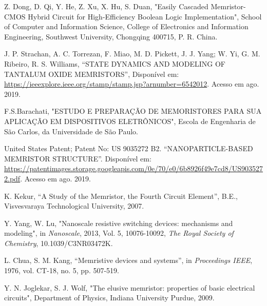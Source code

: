 \documentclass{ceel}
\begin{document}
\begin{multicols}{2}
\begin{thebibliography}{9}
    Z. Dong, D. Qi, Y. He, Z. Xu, X. Hu, S. Duan, "Easily Cascaded Memristor-CMOS Hybrid Circuit
for High-Efficiency Boolean Logic Implementation", School of Computer and Information Science,
College of Electronics and Information Engineering,
Southwest University, Chongqing 400715, P. R. China.

    J. P. Strachan, A. C. Torrezan, F. Miao, M. D. Pickett, J. J. Yang; W. Yi, G. M. Ribeiro, R. S. Williams, “STATE DYNAMICS AND MODELING OF TANTALUM OXIDE MEMRISTORS”, Disponível em: \url{https://ieeexplore.ieee.org/stamp/stamp.jsp?arnumber=6542012}. Acesso em ago. 2019.
 
   F.S.Barachati, "ESTUDO E PREPARAÇÃO DE MEMORISTORES PARA SUA APLICAÇÃO EM DISPOSITIVOS ELETRÔNICOS", Escola de Engenharia de São Carlos, da Universidade de São Paulo. 

    United States Patent; Patent No: US 9035272 B2. “NANOPARTICLE-BASED MEMRISTOR STRUCTURE”. Disponível em: \url{https://patentimages.storage.googleapis.com/0e/70/e0/6b8926f49e7cd8/US9035272.pdf}. Acesso em ago. 2019.
    

    K. Kekur,
    “A Study of the Memristor, the Fourth Circuit Element”, 
   B.E., Visvesvaraya Technological University, 2007.

Y. Yang, W. Lu,
"Nanoscale resistive switching devices: mechanisms and modeling",
in \emph{Nanoscale},
2013, Vol. 5, 10076-10092, \emph{The Royal Society of Chemistry}, 10.1039/C3NR03472K. 

    L. Chua, S. M. Kang,
    “Memristive devices and systems”, 
    in \emph{Proceedings IEEE}, 1976, vol. CT-18, no. 5, pp. 507-519.

    Y. N. Joglekar, S. J. Wolf, "The elusive memristor: properties of basic electrical circuits", Department of Physics, Indiana University Purdue, 2009.





\end{thebibliography}
\end{multicols}
\end{document}

